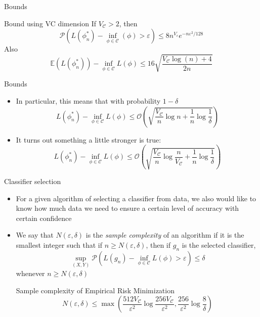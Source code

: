 \documentclass{beamer}
\renewcommand{\Pr}[1]{\mathcal{P} \left( #1 \right)}
\newcommand{\cls}{\mathcal{C}}
\newcommand{\E}[1]{\mathbb{E}\left( #1 \right)}
\newcommand{\pa}[1]{\left( #1 \right)}
\newcommand{\eps}{\varepsilon}
\begin{document}
\begin{frame}{Bounds}
\begin{block}{Bound using VC dimension}
If $V_\cls > 2$, then
\[ \Pr{ L(\phi^*_n) - \inf_{\phi \in \cls} (\phi) > \eps } \leq 8 n^{V_c}e^{-n \eps^2/128} \]
Also
\[ \E{L(\phi^*_n)} - \inf_{\phi\in\cls} L(\phi) \leq 16 \sqrt{\frac{V_\cls \log(n) + 4}{2n}} \]
\end{block}
\end{frame}

\begin{frame}{Bounds}
\begin{itemize}
\item In particular, this means that with probability $1-\delta$
\[ L(\phi^*_n) - \inf_{\phi\in\cls} L(\phi) \leq \mathcal{O}\pa{\sqrt{\frac{V_\cls}{n} \log n  + \frac1n \log\frac1\delta}} \]
\item It turns out something a little stronger is true:
\[ L(\phi^*_n) - \inf_{\phi\in\cls} L(\phi) \leq \mathcal{O}\pa{\sqrt{\frac{V_\cls}{n} \log\frac{n}{V_\cls}+ \frac1n \log\frac1\delta}} \]
\end{itemize}
\end{frame}


\begin{frame}{Classifier selection}
\begin{itemize}
\item For a given algorithm of selecting a classifier from data, we also would like to know how much data we need to ensure a certain level of accuracy with certain confidence
\item We say that $N(\eps,\delta)$ is the \emph{sample complexity} of an algorithm if it is the smallest integer such that if $n \geq N(\eps,\delta)$, then if $g_n$ is the selected classifier,
\[ \sup_{(X,Y)} \Pr{ L(g_n) - \inf_{\phi \in \cls} L(\phi) > \eps} \leq \delta \]
whenever $n \geq N(\eps,\delta)$
\begin{block}{Sample complexity of Empirical Risk Minimization}
\[ N(\eps, \delta) \leq \max\pa{ \frac{512 V_\cls}{\eps^2} \log\frac{256V_\cls}{\eps^2}, \frac{256}{\eps^2}\log\frac8\delta}\]
\end{block}
\end{itemize}
\end{frame}
\end{document}
